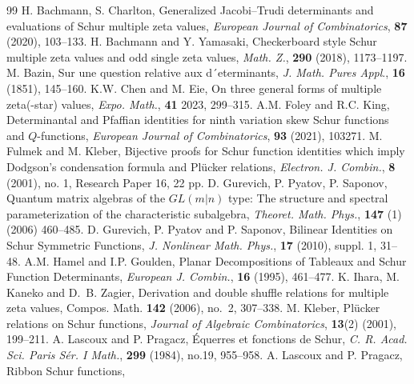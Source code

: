 \documentclass[12pt]{amsart}%
\theoremstyle{definition}
\begin{document}
\begin{thebibliography}{99}
H. Bachmann, S. Charlton,
Generalized Jacobi–Trudi determinants and evaluations of Schur multiple zeta values, 
{\it European Journal of Combinatorics}, {\bf 87} (2020), 103--133.
H. Bachmann and Y. Yamasaki,
Checkerboard style Schur multiple zeta values and odd single zeta values,
{\it Math. Z.}, {\bf 290} (2018), 1173--1197.
M. Bazin,
Sur une question relative aux d´eterminants, 
{\it J. Math. Pures Appl}., {\bf 16} (1851), 145--160.
K.W. Chen and M. Eie, 
On three general forms of multiple zeta(-star) values, 
{\it Expo. Math.}, {\bf 41} 2023, 299--315.
A.M. Foley and R.C. King, 
Determinantal and Pfaffian identities for ninth variation skew Schur functions and $Q$-functions, 
{\it European Journal of Combinatorics}, {\bf 93} (2021), 103271.
M. Fulmek and M. Kleber, 
Bijective proofs for Schur function identities which imply Dodgson's condensation formula and Pl\"{u}cker relations, 
{\it Electron. J. Combin.}, {\bf 8} (2001), no. 1, Research Paper 16, 22 pp.
D. Gurevich, P. Pyatov, P. Saponov, 
Quantum matrix algebras of the $GL(m|n)$ type: 
The structure and spectral parameterization of the characteristic subalgebra,
{\it Theoret. Math. Phys.}, {\bf 147} (1) (2006) 460--485. 
D. Gurevich, P. Pyatov and P. Saponov, 
Bilinear Identities on Schur Symmetric Functions, 
{\it J. Nonlinear Math. Phys.}, {\bf 17} (2010), suppl. 1, 31--48.
A.M. Hamel and I.P. Goulden, 
Planar Decompositions of Tableaux and Schur Function Determinants, 
{\it European J. Combin.}, {\bf 16} (1995), 461--477.
K. Ihara, M. Kaneko and D.~B. Zagier, Derivation and double shuffle relations for multiple zeta values, Compos. Math. {\bf 142} (2006), no.~2, 307--338.
M. Kleber, Pl\" ucker relations on Schur functions, 
{\it Journal of Algebraic Combinatorics}, {\bf 13}(2) (2001), 199--211.
A. Lascoux and P. Pragacz, 
\'Equerres et fonctions de Schur, 
{\it C. R. Acad. Sci. Paris Sér. I Math.}, {\bf 299} (1984), no.19, 955--958.
A. Lascoux and P. Pragacz,
Ribbon Schur functions,

\end{thebibliography}
\end{document}
